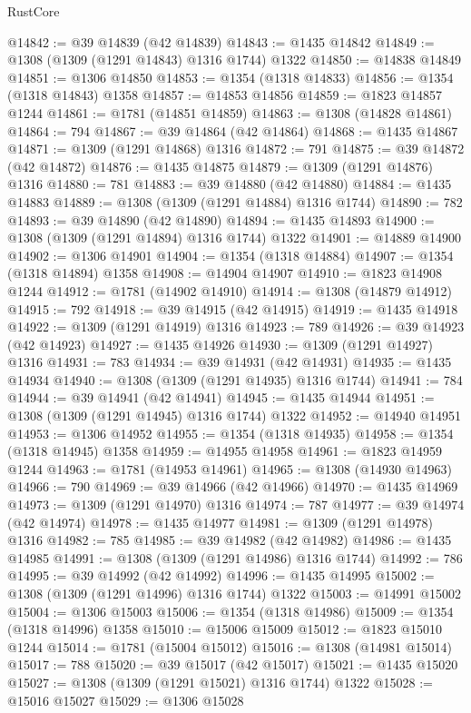 \begin{lexlean}{RustCore}
\begin{coremodule}
@14842 := @39 @14839 (@42 @14839)
@14843 := @1435 @14842
@14849 := @1308 (@1309 (@1291 @14843) @1316 @1744) @1322
@14850 := @14838 @14849
@14851 := @1306 @14850
@14853 := @1354 (@1318 @14833)
@14856 := @1354 (@1318 @14843) @1358
@14857 := @14853 @14856
@14859 := @1823 @14857 @1244
@14861 := @1781 (@14851 @14859)
@14863 := @1308 (@14828 @14861)
@14864 := 794
@14867 := @39 @14864 (@42 @14864)
@14868 := @1435 @14867
@14871 := @1309 (@1291 @14868) @1316
@14872 := 791
@14875 := @39 @14872 (@42 @14872)
@14876 := @1435 @14875
@14879 := @1309 (@1291 @14876) @1316
@14880 := 781
@14883 := @39 @14880 (@42 @14880)
@14884 := @1435 @14883
@14889 := @1308 (@1309 (@1291 @14884) @1316 @1744)
@14890 := 782
@14893 := @39 @14890 (@42 @14890)
@14894 := @1435 @14893
@14900 := @1308 (@1309 (@1291 @14894) @1316 @1744) @1322
@14901 := @14889 @14900
@14902 := @1306 @14901
@14904 := @1354 (@1318 @14884)
@14907 := @1354 (@1318 @14894) @1358
@14908 := @14904 @14907
@14910 := @1823 @14908 @1244
@14912 := @1781 (@14902 @14910)
@14914 := @1308 (@14879 @14912)
@14915 := 792
@14918 := @39 @14915 (@42 @14915)
@14919 := @1435 @14918
@14922 := @1309 (@1291 @14919) @1316
@14923 := 789
@14926 := @39 @14923 (@42 @14923)
@14927 := @1435 @14926
@14930 := @1309 (@1291 @14927) @1316
@14931 := 783
@14934 := @39 @14931 (@42 @14931)
@14935 := @1435 @14934
@14940 := @1308 (@1309 (@1291 @14935) @1316 @1744)
@14941 := 784
@14944 := @39 @14941 (@42 @14941)
@14945 := @1435 @14944
@14951 := @1308 (@1309 (@1291 @14945) @1316 @1744) @1322
@14952 := @14940 @14951
@14953 := @1306 @14952
@14955 := @1354 (@1318 @14935)
@14958 := @1354 (@1318 @14945) @1358
@14959 := @14955 @14958
@14961 := @1823 @14959 @1244
@14963 := @1781 (@14953 @14961)
@14965 := @1308 (@14930 @14963)
@14966 := 790
@14969 := @39 @14966 (@42 @14966)
@14970 := @1435 @14969
@14973 := @1309 (@1291 @14970) @1316
@14974 := 787
@14977 := @39 @14974 (@42 @14974)
@14978 := @1435 @14977
@14981 := @1309 (@1291 @14978) @1316
@14982 := 785
@14985 := @39 @14982 (@42 @14982)
@14986 := @1435 @14985
@14991 := @1308 (@1309 (@1291 @14986) @1316 @1744)
@14992 := 786
@14995 := @39 @14992 (@42 @14992)
@14996 := @1435 @14995
@15002 := @1308 (@1309 (@1291 @14996) @1316 @1744) @1322
@15003 := @14991 @15002
@15004 := @1306 @15003
@15006 := @1354 (@1318 @14986)
@15009 := @1354 (@1318 @14996) @1358
@15010 := @15006 @15009
@15012 := @1823 @15010 @1244
@15014 := @1781 (@15004 @15012)
@15016 := @1308 (@14981 @15014)
@15017 := 788
@15020 := @39 @15017 (@42 @15017)
@15021 := @1435 @15020
@15027 := @1308 (@1309 (@1291 @15021) @1316 @1744) @1322
@15028 := @15016 @15027
@15029 := @1306 @15028

\end{coremodule}
\end{lexlean}
